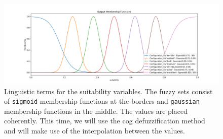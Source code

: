 \begin{figure}[H]
    \centering
    \includegraphics[width=\columnwidth,trim={1cm 0 2cm 1.5cm},clip]{figures/DataAnalytics/membership_suitability_config.png}
    \caption[Linguistic variable for the Suitability attribute]{
        Linguistic terms for the suitability variables. The fuzzy sets consist of  \texttt{sigmoid} membership functions at the borders and \texttt{gaussian} membership functions in the middle. The values are placed coherently. This time, we will use the \gls{cog} defuzzification method and will make use of the interpolation between the values.
    }
    \label{fig:suitabilityClasses}
\end{figure}


